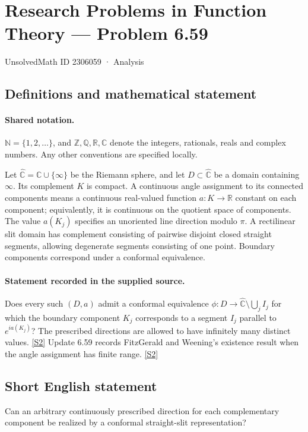 \documentclass[11pt]{article}
\newcommand{\sref}[2]{\hyperlink{source:#1:#2}{[S#2]}}
\begin{document}
\setcounter{section}{2306058}
\section{Research Problems in Function Theory — Problem 6.59}\label{2306059}
{\small\sffamily UnsolvedMath ID 2306059 · Analysis}
\subsection{Definitions and mathematical statement}

\paragraph{Shared notation.}$\mathbb N=\{1,2,\ldots\}$, and $\mathbb Z,\mathbb Q,\mathbb R,\mathbb C$ denote the integers, rationals, reals and complex numbers. Any other conventions are specified locally.


Let $\widehat{\mathbb C}=\mathbb C\cup\{\infty\}$ be the Riemann sphere, and let $D\subset\widehat{\mathbb C}$ be a domain containing $\infty$. Its complement $K$ is compact. A continuous angle assignment to its connected components means a continuous real-valued function $a:K\to\mathbb R$ constant on each component; equivalently, it is continuous on the quotient space of components. The value $a(K_j)$ specifies an unoriented line direction modulo $\pi$. A rectilinear slit domain has complement consisting of pairwise disjoint closed straight segments, allowing degenerate segments consisting of one point. Boundary components correspond under a conformal equivalence.
\paragraph{Statement recorded in the supplied source.}
Does every such $(D,a)$ admit a conformal equivalence $\phi:D\to\widehat{\mathbb C}\setminus\bigcup_j I_j$ for which the boundary component $K_j$ corresponds to a segment $I_j$ parallel to $e^{ia(K_j)}$? The prescribed directions are allowed to have infinitely many distinct values. \sref{2306059}{2}
Update 6.59 records FitzGerald and Weening's existence result when the angle assignment has finite range. \sref{2306059}{2}
\subsection{Short English statement}
Can an arbitrary continuously prescribed direction for each complementary component be realized by a conformal straight-slit representation?
\end{document}
